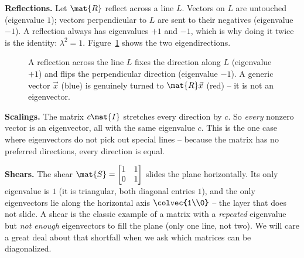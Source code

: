 \textbf{Reflections.} Let $\mat{R}$ reflect across a line $L$. Vectors on $L$ are
untouched (eigenvalue $1$); vectors perpendicular to $L$ are sent to their
negatives (eigenvalue $-1$). A reflection always has eigenvalues $+1$ and $-1$,
which is why doing it twice is the identity: $\lambda^2=1$.
Figure~\ref{ch23:fig-reflection} shows the two eigendirections.

\begin{figure}[H]
\centering
{}
\caption{A reflection across the line $L$ fixes the direction along $L$ (eigenvalue
$+1$) and flips the perpendicular direction (eigenvalue $-1$). A generic vector
$\vec{x}$ (blue) is genuinely turned to $\mat{R}\vec{x}$ (red) -- it is not an
eigenvector.}
\label{ch23:fig-reflection}
\end{figure}

\textbf{Scalings.} The matrix $c\mat{I}$ stretches every direction by $c$. So
\emph{every} nonzero vector is an eigenvector, all with the same eigenvalue $c$.
This is the one case where eigenvectors do not pick out special lines -- because
the matrix has no preferred directions, every direction is equal.

\textbf{Shears.} The shear $\mat{S}=\begin{bmatrix}1&1\\0&1\end{bmatrix}$ slides
the plane horizontally. Its only eigenvalue is $1$ (it is triangular, both diagonal
entries $1$), and the only eigenvectors lie along the horizontal axis
$\colvec{1\\0}$ -- the layer that does not slide. A shear is the classic example
of a matrix with a \emph{repeated} eigenvalue but \emph{not enough} eigenvectors
to fill the plane (only one line, not two). We will care a great deal about that
shortfall when we ask which matrices can be diagonalized.

